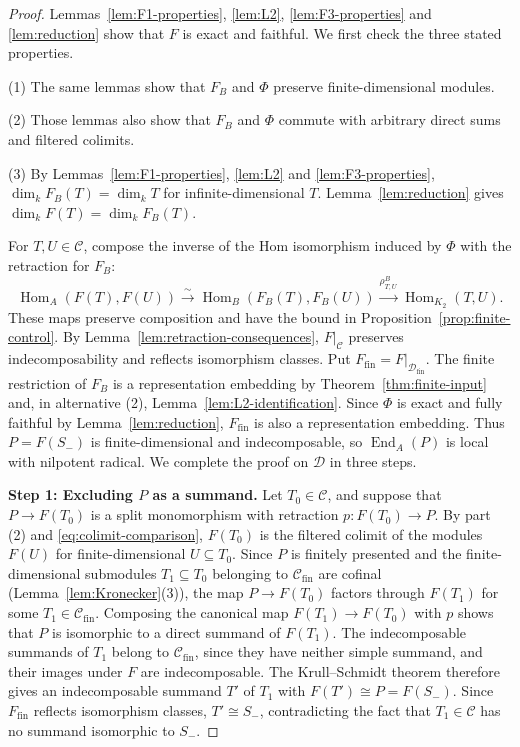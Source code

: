 \documentclass[a4paper,reqno,10pt]{amsart}
\theoremstyle{definition}
\DeclareMathOperator{\Hom}{Hom}
\DeclareMathOperator{\End}{End}
\newcommand{\dm}{\dim_k}
\newcommand{\D}{\mathcal D}
\newcommand{\C}{\mathcal C}
\numberwithin{equation}{section}
\begin{document}
\begin{proof}
Lemmas~\ref{lem:F1-properties}, \ref{lem:L2}, \ref{lem:F3-properties}
and \ref{lem:reduction} show that $F$ is exact and faithful.
We first check the three stated properties.

(1) The same lemmas show that $F_B$ and $\Phi$ preserve finite-dimensional modules.

(2) Those lemmas also show that $F_B$ and $\Phi$ commute with arbitrary
direct sums and filtered colimits.

(3) By Lemmas~\ref{lem:F1-properties}, \ref{lem:L2} and
\ref{lem:F3-properties}, $\dm F_B(T)=\dm T$ for infinite-dimensional
$T$. Lemma~\ref{lem:reduction} gives $\dm F(T)=\dm F_B(T)$.

For $T,U\in\C$, compose the inverse of the Hom isomorphism induced by
$\Phi$ with the retraction for $F_B$:
\[
 \Hom_A(F(T),F(U))\xrightarrow{\sim}
 \Hom_B(F_B(T),F_B(U))\xrightarrow{\rho^B_{T,U}}\Hom_{K_2}(T,U).
\]
These maps preserve composition and have the bound in
Proposition~\ref{prop:finite-control}. By
Lemma~\ref{lem:retraction-consequences}, $F|_\C$ preserves
indecomposability and reflects isomorphism classes.
Put $F_{\mathrm{fin}}=F|_{\D_{\mathrm{fin}}}$. The finite restriction
of $F_B$ is a representation embedding by Theorem~\ref{thm:finite-input}
and, in alternative (2), Lemma~\ref{lem:L2-identification}. Since $\Phi$
is exact and fully faithful by Lemma~\ref{lem:reduction},
$F_{\mathrm{fin}}$ is also a representation embedding. Thus $P=F(S_-)$
is finite-dimensional and indecomposable, so $\End_A(P)$ is local with
nilpotent radical. We complete the proof on $\D$ in three steps.

\noindent\textbf{Step 1: Excluding $P$ as a summand.}
Let $T_0\in\C$, and suppose that $P\to F(T_0)$ is a split monomorphism with retraction $p:F(T_0)\to P$. By part (2) and \eqref{eq:colimit-comparison}, $F(T_0)$ is the filtered
colimit of the modules $F(U)$ for finite-dimensional $U\subseteq T_0$. Since $P$
is finitely presented and the finite-dimensional submodules $T_1\subseteq T_0$ belonging to
$\C_{\mathrm{fin}}$ are cofinal
(Lemma~\ref{lem:Kronecker}(3)), the map $P\to F(T_0)$ factors through
$F(T_1)$ for some $T_1\in\C_{\mathrm{fin}}$. Composing the canonical map
$F(T_1)\to F(T_0)$ with $p$ shows that $P$ is isomorphic to a direct summand of
$F(T_1)$.
The indecomposable summands of $T_1$ belong to $\C_{\mathrm{fin}}$,
since they have neither simple summand, and their images under $F$
are indecomposable. The Krull--Schmidt theorem therefore gives an
indecomposable summand $T'$ of $T_1$ with $F(T')\cong P=F(S_-)$.
Since $F_{\mathrm{fin}}$ reflects isomorphism classes,
$T'\cong S_-$,
contradicting the fact that $T_1\in\C$ has no summand isomorphic to $S_-$.


\end{proof}
\end{document}
